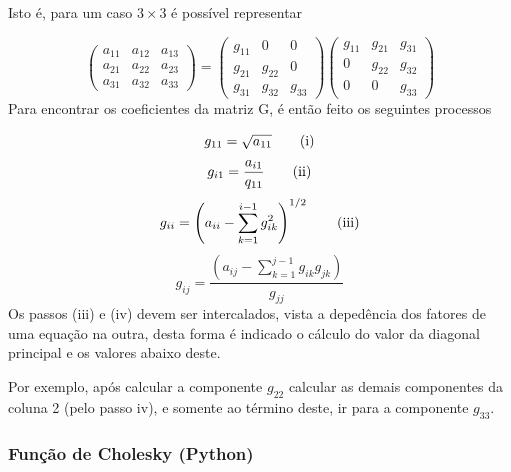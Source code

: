 \documentclass[
]{book}
\begin{document}
Isto é, para um caso \(3 \times 3\) é possível representar

\[\begin{pmatrix} 
a_{11} & a_{12} & a_{13} \\
a_{21} & a_{22} & a_{23} \\
a_{31} & a_{32} & a_{33} 
\end{pmatrix} = 
\begin{pmatrix}
g_{11} & 0 & 0 \\
g_{21} & g_{22} & 0 \\
g_{31} & g_{32} & g_{33} 
\end{pmatrix}
\begin{pmatrix}
g_{11} & g_{21} & g_{31} \\
0 & g_{22} & g_{32} \\
0 & 0 & g_{33} 
\end{pmatrix}
\]
Para encontrar os coeficientes da matriz G, é então feito os seguintes processos

\[
g_{11} = \sqrt{a_{11}} \tag{i}\\
\]
\[
g_{i1} = \frac{a_{i1}}{q_{11}} \tag{ii}\\
\]
\[
g_{ii} = \left(a_{ii} - \sum_{k=1}^{i-1} g_{ik}^2 \right)^{1/2} \tag{iii}\\
\]
\[
g_{ij} = \frac{\left(a_{ij} - \sum_{k=1}^{j-1} g_{ik}g_{jk} \right)}{g_{jj}} \tag{iv}
\]
Os passos (iii) e (iv) devem ser intercalados, vista a depedência dos fatores de uma equação na outra, desta forma é indicado o cálculo do valor da diagonal principal e os valores abaixo deste.

Por exemplo, após calcular a componente \(g_{22}\) calcular as demais componentes da coluna 2 (pelo passo iv), e somente ao término deste, ir para a componente \(g_{33}\).

\hypertarget{funuxe7uxe3o-de-cholesky-python}{%
\subsubsection{Função de Cholesky (Python)}\label{funuxe7uxe3o-de-cholesky-python}}
\end{document}
